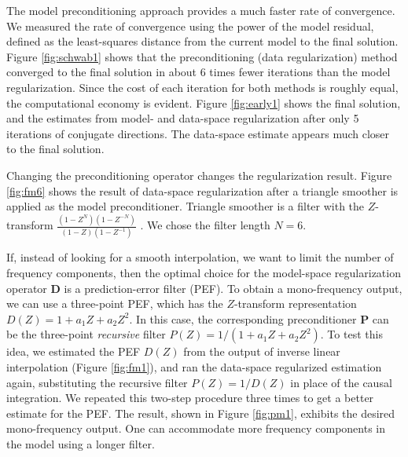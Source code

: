 The model preconditioning approach provides a much faster rate of convergence.
We measured the rate of convergence using the power of the model residual,
defined as the least-squares distance from the current model to the final
solution.  Figure \ref{fig:schwab1} shows that the preconditioning (data
regularization) method converged to the final solution in about 6 times fewer
iterations than the model regularization. Since the cost of each iteration for
both methods is roughly equal, the computational economy is evident.  Figure
\ref{fig:early1} shows the final solution, and the estimates from model- and
data-space regularization after only 5 iterations of conjugate directions. The
data-space estimate appears much closer to the final solution.



Changing the preconditioning operator changes the regularization
result. Figure \ref{fig:fm6} shows the result of data-space
regularization after a triangle smoother is applied as the model
preconditioner. Triangle smoother is a filter with the $Z$-transform
$\frac{\left(1-Z^N\right)\left(1-Z^{-N}\right)}{(1-Z)\left(1-Z^{-1}\right)}$
\cite[]{Claerbout.blackwell.92}. We chose the filter length $N=6$.


If, instead of looking for a smooth interpolation, we want to limit the number
of frequency components, then the optimal choice for the model-space
regularization operator $\mathbf{D}$ is a prediction-error filter (PEF). To
obtain a mono-frequency output, we can use a three-point PEF, which has the
$Z$-transform representation $D (Z) = 1 + a_1 Z + a_2 Z^2$. In this case, the
corresponding preconditioner $\mathbf{P}$ can be the three-point
\emph{recursive} filter $P (Z) = 1 / (1 + a_1 Z + a_2 Z^2)$. To test this
idea, we estimated the PEF $D (Z)$ from the output of inverse linear
interpolation (Figure \ref{fig:fm1}), and ran the data-space regularized
estimation again, substituting the recursive filter $P (Z) = 1/ D(Z)$ in place
of the causal integration.  We repeated this two-step procedure three times to
get a better estimate for the PEF. The result, shown in Figure \ref{fig:pm1},
exhibits the desired mono-frequency output. One can accommodate more frequency
components in the model using a longer filter.


